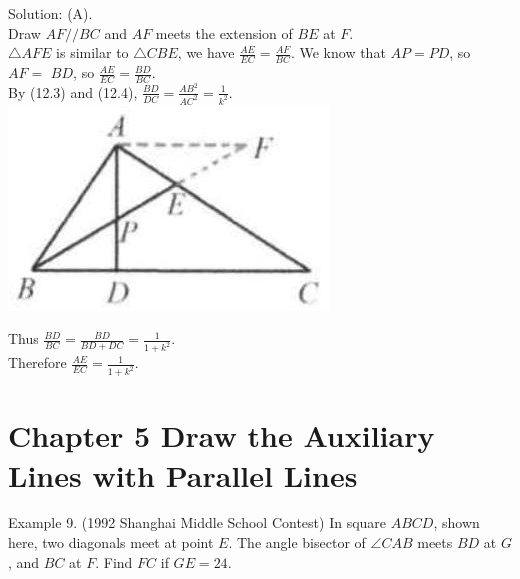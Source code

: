 \documentclass[10pt]{article}
\begin{document}
Solution: (A).\\
Draw \(A F / / B C\) and \(A F\) meets the extension of \(B E\) at \(F\).\\
\(\triangle A F E\) is similar to \(\triangle C B E\), we have \(\frac{A E}{E C}=\frac{A F}{B C}\). We know that \(A P=P D\), so \(A F=\) \(B D\), so \(\frac{A E}{E C}=\frac{B D}{B C}\).\\
By (12.3) and (12.4), \(\frac{B D}{D C}=\frac{A B^{2}}{A C^{2}}=\frac{1}{k^{2}}\).\\
\includegraphics[max width=\textwidth, center]{2025_04_17_97bc1f7e44d93c271a88g-108}

Thus \(\frac{B D}{B C}=\frac{B D}{B D+D C}=\frac{1}{1+k^{2}}\).\\
Therefore \(\frac{A E}{E C}=\frac{1}{1+k^{2}}\).

\section*{Chapter 5 Draw the Auxiliary Lines with Parallel Lines}
Example 9. (1992 Shanghai Middle School Contest) In square \(A B C D\), shown here, two diagonals meet at point \(E\). The angle bisector of \(\angle C A B\) meets \(B D\) at \(G\), and \(B C\) at \(F\). Find \(F C\) if \(G E=24\).
\end{document}
